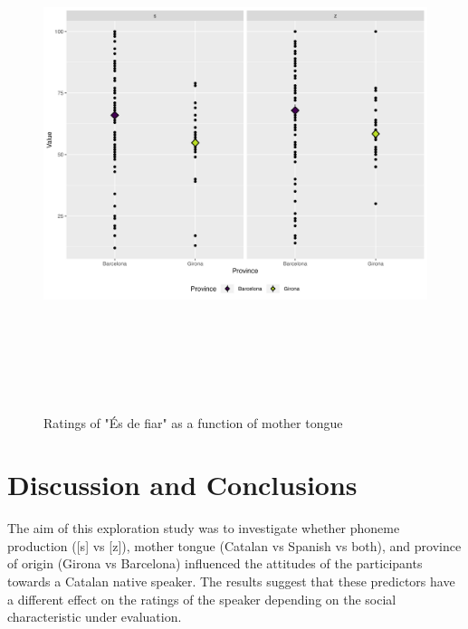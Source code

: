 \documentclass[
  a4paper,
  11pt,
  twocolumn]{article}
\begin{document}
\begin{figure}[!ht]
\begin{center}
\includegraphics[height=15cm]{./includes/figures/fiar.png}
\caption{Ratings of "És de fiar" as a function of mother tongue}\label{fig:fiar}
\end{center}
\end{figure}

\section{Discussion and Conclusions}

The aim of this exploration study was to investigate whether phoneme
production ({[}s{]} vs {[}z{]}), mother tongue (Catalan vs Spanish vs
both), and province of origin (Girona vs Barcelona) influenced the
attitudes of the participants towards a Catalan native speaker. The
results suggest that these predictors have a different effect on the
ratings of the speaker depending on the social characteristic under
evaluation.
\end{document}
